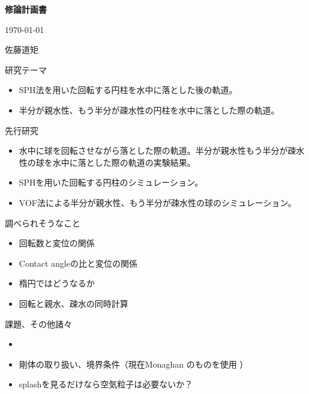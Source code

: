 \documentclass{jsarticle}
\begin{document}
\begin{center}
\LARGE{\textbf{修論計画書}}
\end{center}

\begin{flushright}
  \today

佐藤道矩
\end{flushright}

研究テーマ
\begin{itemize}
\item SPH法\cite{Monaghan2005, Teschner}を用いた回転する円柱を水中に落とした後の軌道。
\item 半分が親水性、もう半分が疎水性の円柱を水中に落とした際の軌道。
\end{itemize}


先行研究
\begin{itemize}
\item 水中に球を回転させながら落とした際の軌道。半分が親水性もう半分が疎水性の球を水中に落とした際の軌道の実験結果。\cite{Truscott} 
\item SPHを用いた回転する円柱のシミュレーション。\cite{Kiara} 
\item VOF法による半分が親水性、もう半分が疎水性の球のシミュレーション。\cite{Zhao} 
\end{itemize}

調べられそうなこと
\begin{itemize}
\item 回転数と変位の関係
\item Contact angleの比と変位の関係
\item 楕円ではどうなるか
\item 回転と親水、疎水の同時計算
\end{itemize}
課題、その他諸々
\begin{itemize}
\item {}
\item 剛体の取り扱い、境界条件（現在Monaghan \cite{Monaghan2005}のものを使用 ）
\item splashを見るだけなら空気粒子は必要ないか？
\end{itemize}
\end{document}
